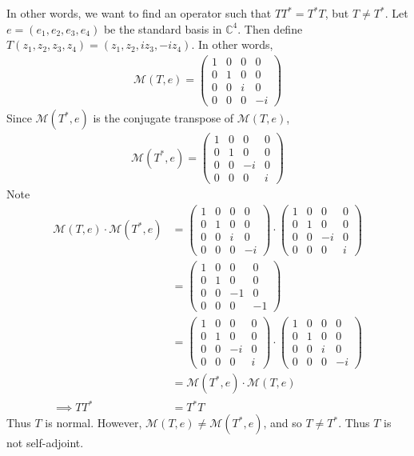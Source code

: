 \documentclass[12pt]{article}
\begin{document}
\noindent In other words, we want to find an operator such that $TT^* = T^*T$, but $T \neq T^*$.  Let $e = (e_1, e_2, e_3, e_4)$ be the standard basis in $\mathbb{C}^4$.  Then define $T(z_1, z_2, z_3, z_4) = (z_1, z_2, iz_3, -iz_4)$.  In other words,
\begin{align*}
	\mathcal{M}(T, e) = \left(\begin{array}{cccc}
		1 & 0 & 0 & 0 \\
		0 & 1 & 0 & 0 \\
		0 & 0 & i & 0 \\
		0 & 0 & 0 & -i
	\end{array}\right)
\end{align*}
Since $\mathcal{M}(T^*, e)$ is the conjugate transpose of $\mathcal{M}(T, e)$,
\begin{align*}
	\mathcal{M}(T^*, e) = \left(\begin{array}{cccc}
		1 & 0 & 0 & 0 \\
		0 & 1 & 0 & 0 \\
		0 & 0 & -i & 0 \\
		0 & 0 & 0 & i
	\end{array}\right)
\end{align*}
Note
\begin{align*}
	\mathcal{M}(T, e) \cdot \mathcal{M}(T^*, e) &= \left(\begin{array}{cccc}
		1 & 0 & 0 & 0 \\
		0 & 1 & 0 & 0 \\
		0 & 0 & i & 0 \\
		0 & 0 & 0 & -i
	\end{array}\right) \cdot \left(\begin{array}{cccc}
		1 & 0 & 0 & 0 \\
		0 & 1 & 0 & 0 \\
		0 & 0 & -i & 0 \\
		0 & 0 & 0 & i
	\end{array}\right) \\[.1cm]
	&= \left(\begin{array}{cccc}
		1 & 0 & 0 & 0 \\
		0 & 1 & 0 & 0 \\
		0 & 0 & -1 & 0 \\
		0 & 0 & 0 & -1
	\end{array}\right) \\[.1cm]
	&= \left(\begin{array}{cccc}
		1 & 0 & 0 & 0 \\
		0 & 1 & 0 & 0 \\
		0 & 0 & -i & 0 \\
		0 & 0 & 0 & i
	\end{array}\right) \cdot \left(\begin{array}{cccc}
		1 & 0 & 0 & 0 \\
		0 & 1 & 0 & 0 \\
		0 & 0 & i & 0 \\
		0 & 0 & 0 & -i
	\end{array}\right) \\[.1cm]
	&= \mathcal{M}(T^*, e) \cdot \mathcal{M}(T, e) \\
	\implies TT^* &= T^*T
\end{align*}
Thus $T$ is normal.  However, $\mathcal{M}(T, e) \neq \mathcal{M}(T^*, e)$, and so $T \neq T^*$.  Thus $T$ is not self-adjoint.
\end{document}
